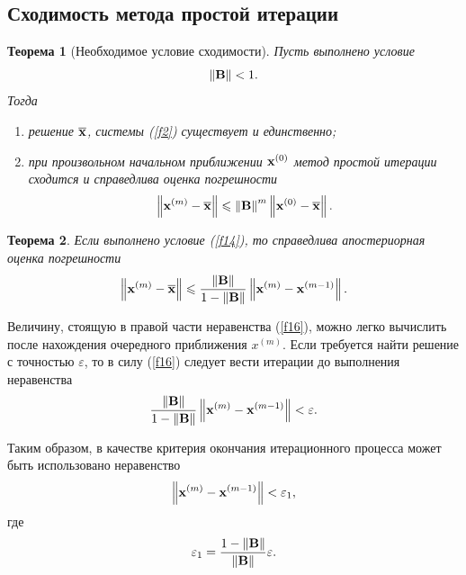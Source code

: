 \documentclass[12pt]{article}
\newtheorem{theorem}{Теорема}
\begin{document}
	\subsection*{Сходимость метода простой итерации}
	
	\begin{theorem}[Необходимое условие сходимости]
		Пусть выполнено \linebreak условие
		\begin{equation}
			\left\|\bold{B}\right\|<1.\label{f14}
		\end{equation}
		Тогда
		\begin{enumerate}
			\item решение $\overline{\bold{x}}$, системы (\ref{f2}) существует и единственно;
			\item при произвольном начальном приближении $\bold{x}^{\left(0\right)}$ метод простой итерации сходится и справедлива оценка погрешности
			\begin{equation}
				\left\|\bold{x}^{\left(m\right)}-\overline{\bold{x}}\right\|\leqslant  \left\|\bold{B}\right\|^{m}\left\|\bold{x}^{\left(0\right)}-\overline{\bold{x}}\right\|.
			\end{equation}
		\end{enumerate}
	\end{theorem}
	
	\begin{theorem}
		Если выполнено условие (\ref{f14}), то справедлива апостериорная оценка погрешности
		\begin{equation}
			\left\|\bold{x}^{\left(m\right)}-\overline{\bold{x}}\right\|\leqslant  
			\frac{\left\|\bold{B}\right\|}{1-\left\|\bold{B}\right\|}\left\|\bold{x}^{\left(m\right)}-\bold{x}^{\left(m-1\right)}\right\|.\label{f16}
		\end{equation}
	\end{theorem}
	
	Величину, стоящую в правой части неравенства (\ref{f16}), можно легко вычислить после нахождения очередного приближения $x^{\left(m\right)}$. Если требуется найти решение с точностью $\varepsilon$, то в силу (\ref{f16}) следует вести итерации до выполнения неравенства
	\begin{equation}
		\frac{\left\|\bold{B}\right\|}{1-\left\|\bold{B}\right\|}\left\|\bold{x}^{\left(m\right)}-\bold{x}^{\left(m-1\right)}\right\|<\varepsilon.
	\end{equation}
	
	Таким образом, в качестве критерия окончания итерационного процесса может быть использовано неравенство
	\begin{equation}
		\left\|\bold{x}^{\left(m\right)}-\bold{x}^{\left(m-1\right)}\right\|<\varepsilon_1,\label{f18}
	\end{equation}
	где $$\varepsilon_1=\frac{1-\left\|\bold{B}\right\|}{\left\|\bold{B}\right\|}\varepsilon.$$
	
\end{document}

